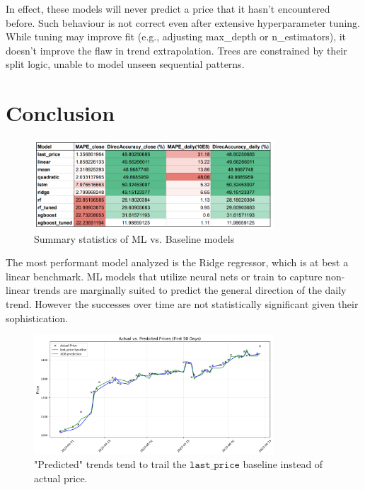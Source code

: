 \documentclass[11pt]{article}
\begin{document}
In effect, these models will never predict a price that it hasn't encountered before. Such behaviour is not correct even after extensive hyperparameter tuning. While tuning may improve fit (e.g., adjusting max\_depth or n\_estimators), it doesn’t improve the flaw in trend extrapolation. Trees are constrained by their split logic, unable to model unseen sequential patterns. \cite{5}


\section{Conclusion}
\label{sec:conclusion}

\begin{figure}[htbp]
    \centering
    \includegraphics[width=0.8\textwidth]{figures/summary.png}
    \caption{Summary statistics of ML vs. Baseline models}
    \label{fig:sample}
\end{figure}

The most performant model analyzed is the Ridge regressor, which is at best a linear benchmark. ML models that utilize neural nets or train to capture non-linear trends are marginally suited to predict the general direction of the daily trend. However the successes over time are not statistically significant given their sophistication.
\newpage
\begin{figure}[htbp]
    \centering
    \includegraphics[width=0.8\textwidth]{figures/cgbfail.png}
    \caption{"Predicted" trends tend to trail the $\texttt{last\_price}$
    baseline instead of actual price.}
    \label{fig:sample}
\end{figure}
\end{document}
